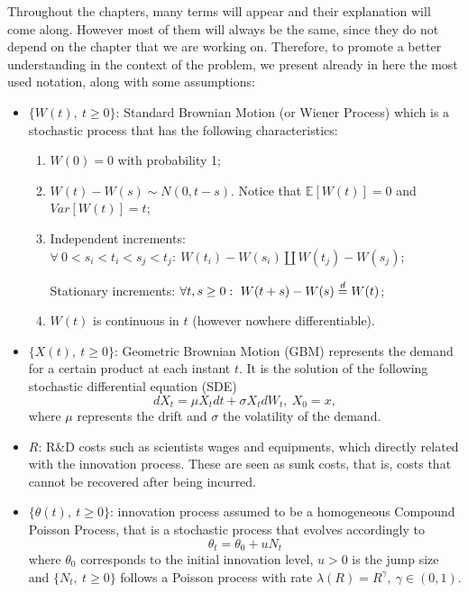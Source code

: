 Throughout the chapters, many terms will appear and their explanation will come along. However most of them will always be the same, since they do not depend on the chapter that we are working on. Therefore, to promote a better understanding in the context of the problem, we present already in here the most used notation, along with some assumptions:
\begin{itemize}
	\item $\{ W(t), \ t \geq 0 \}$: Standard Brownian Motion (or Wiener Process) which is a stochastic process that has the following characteristics:
	\begin{enumerate}
		\item $W(0) = 0$ with probability 1;
		\item $W(t) - W(s) \sim N(0, t-s)$. Notice that $\mathds{E}[W(t)] = 0$ and $Var[W(t)] = t$;
		\item Independent increments: $\forall \ 0 < s_i < t_i < s_j < t_j: \ W(t_i) - W(s_i) \amalg W(t_j) - W(s_j) $;
		
		Stationary increments:  $\forall t,s \geq 0: \ W(t+s) - W(s) \buildrel d\over= W(t) $;
		\item $W(t)$ is continuous in $t$ (however nowhere differentiable).
	\end{enumerate}

	\item  $\{ X(t), \ t \geq 0 \}$: Geometric Brownian Motion (GBM) represents the demand for a certain product at each instant $t$. It is the solution of the following stochastic differential equation (SDE)
	$$ dX_t=\mu X_t dt + \sigma X_t d W_t, \ X_0=x, $$
	where $\mu$ represents the drift and $\sigma$ the volatility of the demand.
	
	\item $R$: R\&D costs such as scientists wages and equipments, which directly related with the innovation process. These are seen as sunk costs, that is, costs that cannot be recovered after being incurred.
	
	\item  $\{ \theta(t), \ t \geq 0 \}$: innovation process assumed to be a homogeneous Compound Poisson Process, that is a stochastic process that evolves accordingly to
	$$\theta_t= \theta_0+ u N_t$$
	where $\theta_0$ corresponds to the initial innovation level, $u > 0$ is the jump size and $\{N_t, \ t \geq 0\}$ follows a Poisson process with rate $\lambda(R)=R^\gamma, \ \gamma \in (0,1)$.
	

\end{itemize}
